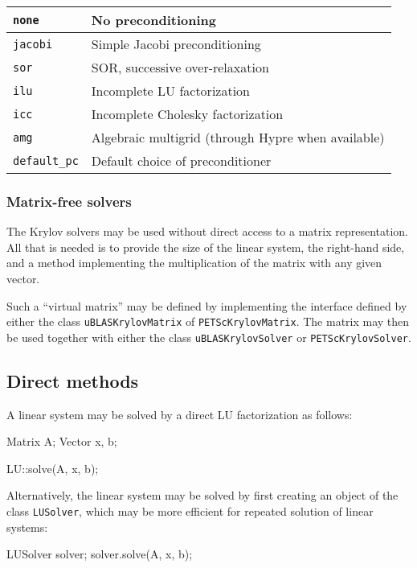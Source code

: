 \begin{center}
\begin{tabular}{|l|l|}
\hline
\texttt{none}        & No preconditioning \\
\hline
\texttt{jacobi}      & Simple Jacobi preconditioning \\
\hline
\texttt{sor}         & SOR, successive over-relaxation \\
\hline
\texttt{ilu}         & Incomplete LU factorization \\
\hline
\texttt{icc}         & Incomplete Cholesky factorization \\
\hline
\texttt{amg}         & Algebraic multigrid (through Hypre when available) \\
\hline
\texttt{default\_pc} & Default choice of preconditioner \\
\hline
\end{tabular}
\end{center}

\subsubsection{Matrix-free solvers}

The \dolfin{} Krylov solvers may be used without direct access to a
matrix representation. All that is needed is to provide the
size of the linear system, the right-hand side, and a method
implementing the multiplication of the matrix with any given vector.

Such a ``virtual matrix'' may be defined by implementing the
interface defined by either the class \texttt{uBLASKrylovMatrix} of
\texttt{PETScKrylovMatrix}. The matrix may then be used together with
either the class \texttt{uBLASKrylovSolver} or \texttt{PETScKrylovSolver}.

\subsection{Direct methods}

A linear system may be solved by a direct LU factorization as follows:
\begin{code}
Matrix A;
Vector x, b;
  
LU::solve(A, x, b);
\end{code}
Alternatively, the linear system may be solved by first creating an
object of the class \texttt{LUSolver}, which may be more efficient for
repeated solution of linear systems:
\begin{code}
LUSolver solver;
solver.solve(A, x, b);
\end{code}

